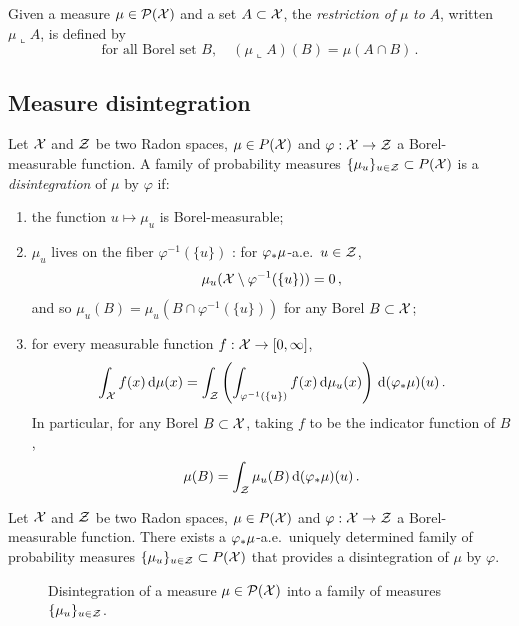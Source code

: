         \begin{defi}
            \label{def:restriction}
            Given a measure $\mu\in\mathcal{P}(\mathcal{X})$ and a set $A\subset \mathcal{X}$, the \emph{restriction of} $\mu$ \emph{to} $A$, written $\mu\llcorner A$, is defined by
            $$\text{for all Borel set }B,\quad (\mu\llcorner A)(B)=\mu(A\cap B)\,.$$
        \end{defi}
    \subsection{Measure disintegration}
    \label{sec:disintegration}
    \begin{defi}
        Let $\mathcal{X}$ and $\mathcal{Z}$ be two Radon spaces, $\mu  \in P(\mathcal{X})$ and $\varphi : \mathcal{X} \to \mathcal{Z}$ a Borel-measurable function. A family of probability measures $\{\mu_{u}\}_{u \in \mathcal{Z}} \subset P(\mathcal{X})$ is a \emph{disintegration} of $\mu$ by $\varphi$ if:
        \begin{enumerate}[label=(\roman*)]
            \item the function $u \mapsto \mu_{u}$ is Borel-measurable;
            \item $\mu_{u}$ lives on the fiber $\varphi^{-1}(\{u\})$ : for $\varphi_*\mu$-a.e.~$u \in \mathcal{Z}$,
            $$\mu_{u}(\mathcal{X} \setminus \varphi^{-1}(\{u\}))=0\,,$$
            and so $\mu_{u}(B)=\mu_{u}(B \cap \varphi^{-1}(\{u\}))$ for any Borel $B\subset \mathcal{X}$;
            \item for every measurable function $f: \mathcal{X} \rightarrow[0, \infty]$,
            $$\int_{\mathcal{X}} f(x) \,\mathrm d \mu(x)=\int_{\mathcal{Z}} \left(\int_{\varphi^{-1}(\{u\})} f(x) \,\mathrm d \mu_{u}(x)\right) \,\mathrm d (\varphi_*\mu)(u)\,.$$
            In particular, for any Borel $B \subset \mathcal{X}$, taking $f$ to be the indicator function of $B$,
            $$\mu(B)=\int_{\mathcal{Z}} \mu_{u}(B) \,\mathrm d (\varphi_*\mu)(u)\,.$$
        \end{enumerate}
    \end{defi}
    \begin{theorem}
        Let $\mathcal{X}$ and $\mathcal{Z}$ be two Radon spaces, $\mu  \in P(\mathcal{X})$ and $\varphi : \mathcal{X} \to \mathcal{Z}$ a Borel-measurable function. There exists a $\varphi_*\mu$-a.e.~uniquely determined family of probability measures $\{\mu_{u}\}_{u \in \mathcal{Z}} \subset P(\mathcal{X})$ that provides a disintegration of $\mu$ by $\varphi$.
    \end{theorem}
        \begin{figure}[h]
            \centering
            
            \caption{Disintegration of a measure $\mu\in\mathcal{P}(\mathcal{X})$ into a family of measures $\{\mu_u\}_{u\in \mathcal{Z}}$.}
            \label{fig:disintegration}
        \end{figure}
